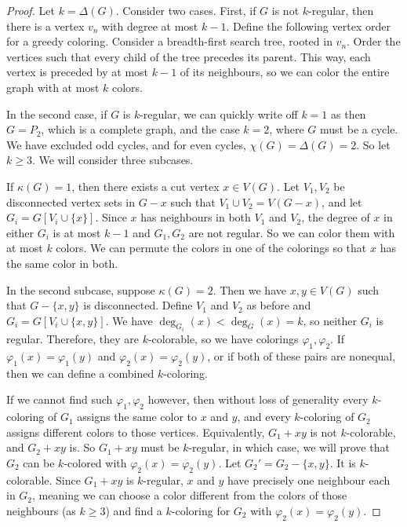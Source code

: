 \begin{proof}
  Let $k = \Delta(G)$.
  Consider two cases.
  First, if $G$ is not $k$-regular, then there is a vertex $v_n$ with degree at
  most $k-1$.
  Define the following vertex order for a greedy coloring.
  Consider a breadth-first search tree, rooted in $v_n$.
  Order the vertices such that every child of the tree precedes its parent.
  This way, each vertex is preceded by at most $k-1$ of its neighbours, so we
  can color the entire graph with at most $k$ colors.

  In the second case, if $G$ is $k$-regular, we can quickly write off $k=1$ as
  then $G = P_2$, which is a complete graph, and the case $k=2$, where $G$ must
  be a cycle.
  We have excluded odd cycles, and for even cycles, $\chi(G) = \Delta(G) = 2$.
  So let $k \ge 3$.
  We will consider three subcases.

  If $\kappa(G) = 1$, then there exists a cut vertex $x \in V(G)$.
  Let $V_1, V_2$ be disconnected vertex sets in $G - x$ such that $V_1 \cup V_2
  = V(G-x)$, and let $G_i = G[V_i \cup \{x\}]$.
  Since $x$ has neighbours in both $V_1$ and $V_2$, the degree of $x$ in either
  $G_i$ is at most $k-1$ and $G_1, G_2$ are not regular.
  So we can color them with at most $k$ colors.
  We can permute the colors in one of the colorings so that $x$ has the same
  color in both.

  In the second subcase, suppose $\kappa(G) = 2$.
  Then we have $x,y \in V(G)$ such that $G - \{x,y\}$ is disconnected.
  Define $V_1$ and $V_2$ as before and $G_i = G[V_i \cup \{x,y\}]$.
  We have $\deg_{G_i}(x) < \deg_G(x) = k$, so neither $G_i$ is regular.
  Therefore, they are $k$-colorable, so we have colorings $\varphi_1,
  \varphi_2$.
  If $\varphi_1(x) = \varphi_1(y)$ and $\varphi_2(x) = \varphi_2(y)$, or if both
  of these pairs are nonequal, then we can define a combined $k$-coloring.

  If we cannot find such $\varphi_1, \varphi_2$ however, then without loss of
  generality every $k$-coloring of $G_1$ assigns the same color to $x$ and $y$,
  and every $k$-coloring of $G_2$ assigns different colors to those vertices.
  Equivalently, $G_1 + xy$ is not $k$-colorable, and $G_2 + xy$ is.
  So $G_1 + xy$ must be $k$-regular, in which case, we will prove that $G_2$ can
  be $k$-colored with $\varphi_2(x) = \varphi_2(y)$.
  Let $G_2' = G_2 - \{x,y\}$.
  It is $k$-colorable.
  Since $G_1 + xy$ is $k$-regular, $x$ and $y$ have precisely one neighbour each
  in $G_2$, meaning we can choose a color different from the colors of those
  neighbours (as $k \ge 3$) and find a $k$-coloring for $G_2$ with $\varphi_2(x)
  = \varphi_2(y)$.


\end{proof}

